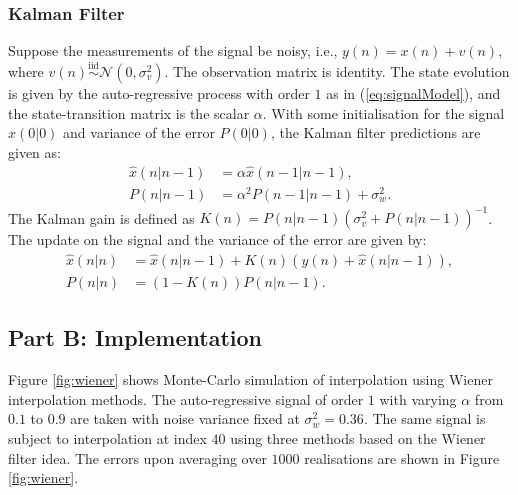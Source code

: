 \documentclass[11pt]{article}
\begin{document}
\subsubsection*{Kalman Filter}
\label{subsubsec:kalman}

Suppose the measurements of the signal be noisy, i.e., $y(n) = x(n) + v(n)$, where $v(n) \overset{\text{iid}}{\sim} \mathcal{N}(0, \sigma_{v}^{2})$. The observation matrix is identity. The state evolution is given by the auto-regressive process with order $1$ as in (\ref{eq:signalModel}), and the state-transition matrix is the scalar $\alpha$. With some initialisation for the signal $\hat{x}(0 | 0)$ and variance of the error $P(0|0)$, the Kalman filter predictions are given as:
\begin{equation}
\begin{split}
	\hat{x}(n|n-1) &= \alpha \hat{x}(n-1 | n-1), \\
	P(n | n-1) &= \alpha^{2}P(n-1 | n-1) + \sigma_{w}^{2}.
\end{split}
\end{equation}
The Kalman gain is defined as $K(n) = P(n | n-1) \left( \sigma_{v}^{2} + P(n | n-1) \right)^{-1}$. The update on the signal and the variance of the error are given by:
\begin{equation}
\begin{split}
	\hat{x}(n|n) &= \hat{x}(n | n-1) + K(n) \left( y(n) + \hat{x}(n | n-1) \right), \\
	P(n | n) &= (1 - K(n)) P(n | n-1).
\end{split}
\end{equation}


\subsection*{Part B: Implementation}
\label{subsec:partB}

Figure \ref{fig:wiener} shows Monte-Carlo simulation of interpolation using Wiener interpolation methods. The auto-regressive signal of order $1$ with varying $\alpha$ from $0.1$ to $0.9$ are taken with noise variance fixed at $\sigma_{w}^{2} = 0.36$. The same signal is subject to interpolation at index $40$ using three methods based on the Wiener filter idea. The errors upon averaging over $1000$ realisations are shown in Figure \ref{fig:wiener}.
\end{document}
